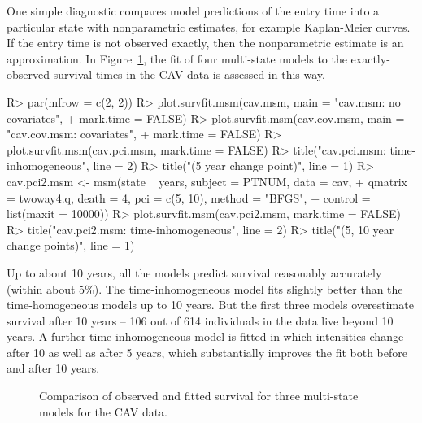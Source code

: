 \documentclass[article,shortnames]{jss}
\begin{document}
One simple diagnostic compares model predictions of the entry time
into a particular state with nonparametric estimates, for example
Kaplan-Meier curves.  If the entry time is not observed exactly, then
the nonparametric estimate is an approximation.  In
Figure~\ref{fig:survfit}, the fit of four multi-state models to the
exactly-observed survival times in the CAV data is assessed in this
way.
\begin{CodeInput}
R> par(mfrow = c(2, 2))
R> plot.survfit.msm(cav.msm, main = "cav.msm: no covariates",
+    mark.time = FALSE)
R> plot.survfit.msm(cav.cov.msm, main = "cav.cov.msm: covariates",
+    mark.time = FALSE)
R> plot.survfit.msm(cav.pci.msm, mark.time = FALSE)
R> title("cav.pci.msm: time-inhomogeneous", line = 2)
R> title("(5 year change point)", line = 1)
R> cav.pci2.msm <- msm(state ~ years, subject = PTNUM, data = cav,
+    qmatrix = twoway4.q, death = 4, pci = c(5, 10), method = "BFGS",
+    control = list(maxit = 10000))
R> plot.survfit.msm(cav.pci2.msm, mark.time = FALSE)
R> title("cav.pci2.msm: time-inhomogeneous", line = 2)
R> title("(5, 10 year change points)", line = 1)
\end{CodeInput}
Up to about 10 years, all the models predict survival reasonably
accurately (within about 5\%).  The time-inhomogeneous model
 fits slightly better than the time-homogeneous
models up to 10 years.  But the first three models overestimate
survival after 10 years -- 106 out of 614 individuals in the data live
beyond 10 years.  A further time-inhomogeneous model
 is fitted in which intensities change after 10 as
well as after 5 years, which substantially improves the fit both
before and after 10 years.

\begin{figure}[t!]
  \centering
    \caption{Comparison of observed and fitted survival for three
    multi-state models for the CAV data.\label{fig:survfit}}
\end{figure}
\end{document}
